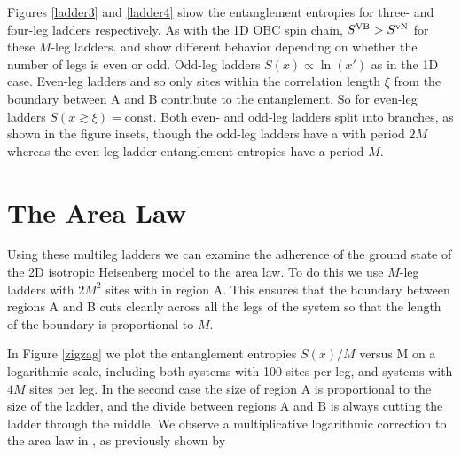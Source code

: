  Figures \ref{ladder3} and \ref{ladder4} show the entanglement entropies for three- and four-leg ladders respectively.
 As with the 1D OBC spin chain, $S^{\text{VB}} > S^{\text{vN}}$ for these $M$-leg ladders.
 \vn and \vb show different behavior depending on whether the number of legs is even or odd.
 Odd-leg ladders 
 $S(x) \propto \ln(x')$ as in the 1D case.
 Even-leg ladders  and so only sites within the correlation length $\xi$ from the boundary between A and B contribute to the entanglement.
So for even-leg ladders $S(x\gtrsim\xi) = \text{const}$.
Both even- and odd-leg ladders split into branches, as shown in the figure insets, though the odd-leg ladders have a  with period $2M$ whereas the even-leg ladder entanglement entropies have a period $M$. 
  
 
\section{The Area Law}

Using these multileg ladders we can examine the adherence of the ground state of the 2D isotropic Heisenberg model to the area law.
To do this we use $M$-leg ladders with $2M^2$ sites with in region A.  
This ensures that the boundary between regions A and B cuts cleanly across all the legs of the system so that the length of the boundary is proportional to $M$.

In Figure \ref{zigzag} we plot the entanglement entropies $S(x)/M$ versus M on a logarithmic scale, including both systems with 100 sites per leg, and systems with $4M$ sites per leg. 
In the second case the size of region A is proportional to the size of the ladder, and the divide between regions A and B is always cutting the ladder through the middle.
We observe a multiplicative logarithmic correction to the area law in \vb, as previously shown by 

